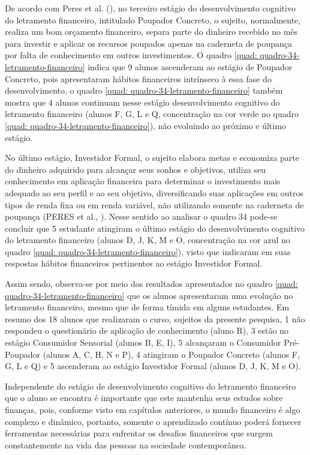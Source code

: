 De acordo com Peres et al. (\citeyear{peres2019}), no terceiro estágio do desenvolvimento cognitivo do letramento financeiro, intitulado Poupador Concreto, o sujeito, normalmente, realiza um bom orçamento financeiro, separa parte do dinheiro recebido no mês para investir e aplicar os recursos poupados apenas na caderneta de poupança por falta de conhecimento em outros investimentos. O quadro \ref{quad: quadro-34-letramento-financeiro} indica que 9 alunos ascenderam ao estágio de Poupador Concreto, pois apresentaram hábitos financeiros intrínseco à essa fase do desenvolvimento, o quadro \ref{quad: quadro-34-letramento-financeiro} também mostra que 4 alunos continuam nesse estágio desenvolvimento cognitivo do letramento financeiro (alunos F, G, L e Q, concentração na cor verde no quadro \ref{quad: quadro-34-letramento-financeiro}), não evoluindo ao próximo e último estágio.

No último estágio, Investidor Formal, o sujeito elabora metas e economiza parte do dinheiro adquirido para alcançar seus sonhos e objetivos, utiliza seu conhecimento em aplicação financeira para determinar o investimento mais adequado ao seu perfil e ao seu objetivo, diversificando suas aplicações em outros tipos de renda fixa ou em renda variável, não utilizando somente na caderneta de poupança (PERES et al., \citeyear{peres2019}). Nesse sentido ao analisar o quadro 34 pode-se concluir que 5 estudante atingiram o último estágio do desenvolvimento cognitivo do letramento financeiro (alunos D, J, K, M e O, concentração na cor azul no quadro \ref{quad: quadro-34-letramento-financeiro}), visto que indicaram em suas respostas hábitos financeiros pertinentes ao estágio Investidor Formal.

Assim sendo, observa-se por meio dos resultados apresentados no quadro \ref{quad: quadro-34-letramento-financeiro} que os alunos apresentaram uma evolução no letramento financeiro, mesmo que de forma tímida em alguns estudantes. Em resumo dos 18 alunos que realizaram o curso, sujeitos da presente pesquisa, 1 não respondeu o questionário de aplicação de conhecimento (aluno R), 3 estão no estágio Consumidor Sensorial (alunos B, E, I), 5 alcançaram o Consumidor Pré-Poupador (alunos A, C, H, N e P), 4 atingiram o Poupador Concreto (alunos F, G, L e Q) e 5 ascenderam ao estágio Investidor Formal (alunos D, J, K, M e O).

Independente do estágio de desenvolvimento cognitivo do letramento financeiro que o aluno se encontra é importante que este mantenha seus estudos sobre finanças, pois, conforme visto em capítulos anteriores, o mundo financeiro é algo complexo e dinâmico, portanto, somente o aprendizado contínuo poderá fornecer ferramentas necessárias para enfrentar os desafios financeiros que surgem constantemente na vida das pessoas na sociedade contemporânea.

